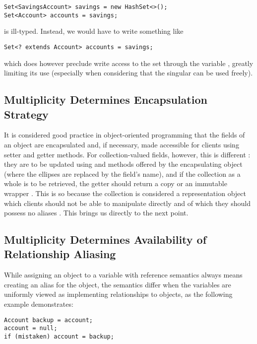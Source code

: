 {\begin{lstlisting}
Set<SavingsAccount> savings = new HashSet<>();
Set<Account> accounts = savings;
\end{lstlisting}

\noindent is ill-typed. Instead, we would have to write something like

\begin{lstlisting}
Set<? extends Account> accounts = savings;
\end{lstlisting}

\noindent \cite{ref24} which does however preclude write access to the set through
the variable , greatly limiting its use (especially when
considering that the singular  can be used freely).

\subsection{Multiplicity Determines Encapsulation Strategy}
\label{section2.4}

\noindent It is considered good practice in object-oriented programming that
the fields of an object are encapsulated and, if necessary, made accessible
for clients using setter and getter methods. For collection-valued fields,
however, this is different \cite{ref16}: they are to be updated using  and
 methods offered by the encapsulating object (where the ellipses
are replaced by the field's name), and if the collection as a whole is
to be retrieved, the getter should return a copy or an immutable wrapper
\cite{ref16}. This is so because the collection is considered a representation
object which clients should not be able to manipulate directly and of which
they should possess no aliases \cite{ref25}. This brings us directly to the next
point.

\subsection{Multiplicity Determines Availability of Relationship Aliasing}
\label{section2.5}

\noindent While assigning an object to a variable with reference semantics
always means creating an alias for the object, the semantics differ when the
variables are uniformly viewed as implementing relationships to objects, as
the following example demonstrates:

\begin{lstlisting}
Account backup = account;
account = null;
if (mistaken) account = backup;
\end{lstlisting}

}
